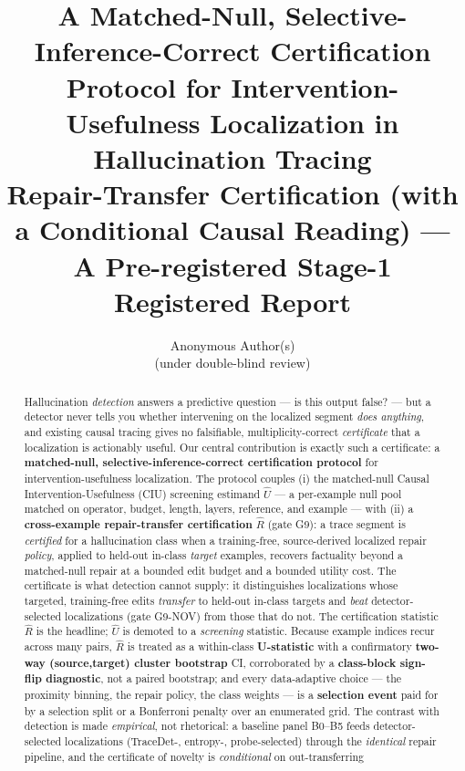 \documentclass[11pt]{article}
\title{\textbf{A Matched-Null, Selective-Inference-Correct Certification\\
Protocol for Intervention-Usefulness Localization in\\
Hallucination Tracing}\\[2pt]
\large Repair-Transfer Certification (with a Conditional Causal Reading) ---\\
\large A Pre-registered Stage-1 Registered Report}
\author{Anonymous Author(s)\\ \small (under double-blind review)}
\date{}
\theoremstyle{plain}
\theoremstyle{definition}
\newcommand{\Uhat}{\widehat{U}}
\newcommand{\Rhat}{\widehat{R}}
\begin{document}
\maketitle

\begin{abstract}
Hallucination \emph{detection} answers a predictive question --- is this output
false? --- but a detector never tells you whether intervening on the localized
segment \emph{does anything}, and existing causal tracing gives no falsifiable,
multiplicity-correct \emph{certificate} that a localization is actionably useful.
Our central contribution is exactly such a certificate: a \textbf{matched-null,
selective-inference-correct certification protocol} for intervention-usefulness
localization. The protocol couples (i) the matched-null Causal
Intervention-Usefulness (CIU) screening estimand $\Uhat$ --- a per-example null
pool matched on operator, budget, length, layers, reference, and example --- with
(ii) a \textbf{cross-example repair-transfer certification} $\Rhat$ (gate G9): a
trace segment is \emph{certified} for a hallucination class when a training-free,
source-derived localized repair \emph{policy}, applied to held-out in-class
\emph{target} examples, recovers factuality beyond a matched-null repair at a
bounded edit budget and a bounded utility cost. The certificate is what detection
cannot supply: it distinguishes localizations whose targeted, training-free edits
\emph{transfer} to held-out in-class targets and \emph{beat} detector-selected
localizations (gate G9-NOV) from those that do not. The certification statistic
$\Rhat$ is the headline; $\Uhat$ is demoted to a \emph{screening} statistic.
Because example indices recur across many pairs, $\Rhat$ is treated as a
within-class \textbf{U-statistic} with a confirmatory \textbf{two-way
(source,target) cluster bootstrap} CI, corroborated by a \textbf{class-block
sign-flip diagnostic}, not a paired bootstrap; and every data-adaptive choice ---
the proximity binning, the repair policy, the class weights --- is a
\textbf{selection event} paid for by a selection split or a Bonferroni penalty
over an enumerated grid. The contrast with detection is made \emph{empirical}, not
rhetorical: a baseline panel B0--B5 feeds detector-selected localizations
(TraceDet-, entropy-, probe-selected) through the \emph{identical} repair
pipeline, and the certificate of novelty is \emph{conditional} on out-transferring

\end{abstract}
\end{document}
